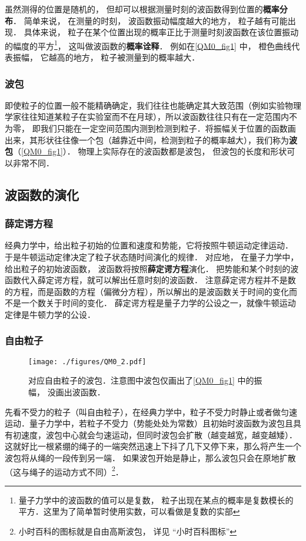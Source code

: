虽然测得的位置是随机的， 但却可以根据测量时刻的波函数得到位置的\textbf{概率分布}． 简单来说， 在测量的时刻， 波函数振动幅度越大的地方， 粒子越有可能出现． 具体来说， 粒子在某个位置出现的概率正比于测量时刻波函数在该位置振动的幅度的平方\footnote{量子力学中的波函数的值可以是复数， 粒子出现在某点的概率是复数模长的平方．这里为了简单暂时使用实数，可以看做是复数的实部}， 这叫做波函数的\textbf{概率诠释}． 例如在\autoref{QM0_fig1} 中， 橙色曲线代表振幅， 它越高的地方， 粒子被测量到的概率越大．

\subsubsection{波包}
即使粒子的位置一般不能精确确定，我们往往也能确定其大致范围（例如实验物理学家往往知道某粒子在实验室而不在月球），所以波函数往往只有在一定范围内不为零， 即我们只能在一定空间范围内测到检测到粒子．将振幅关于位置的函数画出来，其形状往往像一个包（越靠近中间，检测到粒子的概率越大），我们称为\textbf{波包}（\autoref{QM0_fig1}）． 物理上实际存在的波函数都是波包， 但波包的长度和形状可以非常不同．

\subsection{波函数的演化}
\subsubsection{薛定谔方程}
经典力学中，给出粒子初始的位置和速度和势能，它将按照牛顿运动定律运动． 于是牛顿运动定律决定了粒子状态随时间演化的规律． 对应地， 在量子力学中， 给出粒子的初始波函数， 波函数将按照\textbf{薛定谔方程}演化． 把势能和某个时刻的波函数代入薛定谔方程，就可以解出任意时刻的波函数． 注意薛定谔方程并不是数的方程，而是函数的方程（偏微分方程），所以解出的是波函数关于时间的变化而不是一个数关于时间的变化． 薛定谔方程是量子力学的公设之一，就像牛顿运动定律是牛顿力学的公设．

\subsubsection{自由粒子}

\begin{figure}[ht]
\centering
\texttt{[image: ./figures/QM0\_2.pdf]}
\caption{对应自由粒子的波包．注意图中波包仅画出了\autoref{QM0_fig1} 中的振幅， 没画出波函数．} \label{QM0_fig2}
\end{figure}

先看不受力的粒子（叫自由粒子），在经典力学中，粒子不受力时静止或者做匀速运动．量子力学中，若粒子不受力（势能处处为常数）且初始时波函数为波包且具有初速度，波包中心就会匀速运动，但同时波包会扩散（越变越宽，越变越矮）．这就好比一根紧绷的绳子的一端突然迅速上下抖了几下又停下来，那么将产生一个波包将从绳的一段传到另一端． 如果波包开始是静止，那么波包只会在原地扩散（这与绳子的运动方式不同）\footnote{小时百科的图标就是自由高斯波包， 详见 “小时百科图标”}．

